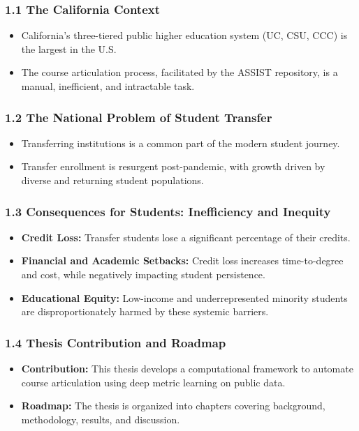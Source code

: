 \documentclass[11pt]{article}
\begin{document}
\subsubsection*{1.1 The California Context}
\begin{itemize}
    \item California's three-tiered public higher education system (UC, CSU, CCC) is the largest in the U.S.
    \item The course articulation process, facilitated by the ASSIST repository, is a manual, inefficient, and intractable task.
\end{itemize}
\subsubsection*{1.2 The National Problem of Student Transfer}
\begin{itemize}
    \item Transferring institutions is a common part of the modern student journey.
    \item Transfer enrollment is resurgent post-pandemic, with growth driven by diverse and returning student populations.
\end{itemize}
\subsubsection*{1.3 Consequences for Students: Inefficiency and Inequity}
\begin{itemize}
    \item \textbf{Credit Loss:} Transfer students lose a significant percentage of their credits.
    \item \textbf{Financial and Academic Setbacks:} Credit loss increases time-to-degree and cost, while negatively impacting student persistence.
    \item \textbf{Educational Equity:} Low-income and underrepresented minority students are disproportionately harmed by these systemic barriers.
\end{itemize}
\subsubsection*{1.4 Thesis Contribution and Roadmap}
\begin{itemize}
    \item \textbf{Contribution:} This thesis develops a computational framework to automate course articulation using deep metric learning on public data.
    \item \textbf{Roadmap:} The thesis is organized into chapters covering background, methodology, results, and discussion.
\end{itemize}
\end{document}
